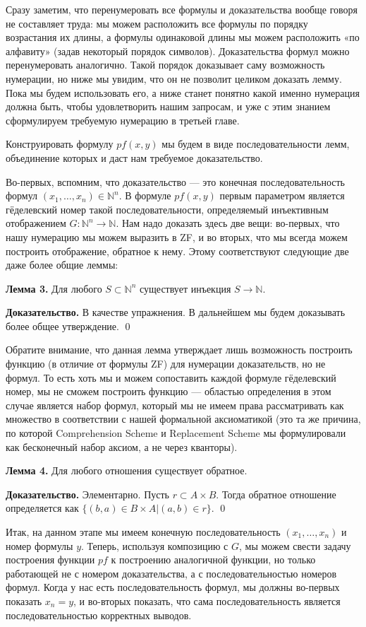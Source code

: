 Сразу заметим, что перенумеровать все формулы и доказательства вообще говоря не составляет труда: мы можем расположить все формулы по порядку возрастания их длины, а формулы одинаковой длины мы можем расположить «по алфавиту» (задав некоторый порядок символов). Доказательства формул можно перенумеровать аналогично. Такой порядок доказывает саму возможность нумерации, но ниже мы увидим, что он не позволит целиком доказать лемму. Пока мы будем использовать его, а ниже станет понятно какой именно нумерация должна быть, чтобы удовлетворить нашим запросам, и уже с этим знанием сформулируем требуемую нумерацию в третьей главе.

Конструировать формулу $pf(x, y)$ мы будем в виде последовательности лемм, объединение которых и даст нам требуемое доказательство.

Во-первых, вспомним, что доказательство — это конечная последовательность формул $(x_1, \ldots, x_n) \in \mathbb{N}^n$. В формуле $pf(x, y)$ первым параметром является гёделевский номер такой последовательности, определяемый инъективным отображением $G: \mathbb{N}^n \to \mathbb{N}$. Нам надо доказать здесь две вещи: во-первых, что нашу нумерацию мы можем выразить в ZF, и во вторых, что мы всегда можем построить отображение, обратное к нему. Этому соответствуют следующие две даже более общие леммы:

{\bfseries Лемма 3.} Для любого $S\subset \mathbb{N}^n$ существует инъекция $S \to \mathbb{N}$.

{\bfseries Доказательство.} В качестве упражнения. В дальнейшем мы будем доказывать более общее утверждение. \qed

Обратите внимание, что данная лемма утверждает лишь возможность построить функцию (в отличие от формулы ZF) для нумерации доказательств, но не формул. То есть хоть мы и можем сопоставить каждой формуле гёделевский номер, мы не сможем построить функцию — областью определения в этом случае является набор формул, который мы не имеем права рассматривать как множество в соответствии с нашей формальной аксиоматикой (это та же причина, по которой Comprehension Scheme и Replacement Scheme мы формулировали как бесконечный набор аксиом, а не через кванторы).

{\bfseries Лемма 4.} Для любого отношения существует обратное.

{\bfseries Доказательство.} Элементарно. Пусть $r\subset A\times B$. Тогда обратное отношение определяется как $\{(b, a)\in B\times A|(a, b)\in r\}$. \qed

Итак, на данном этапе мы имеем конечную последовательность $(x_1, \ldots, x_n)$ и номер формулы $y$. Теперь, используя композицию с $G$, мы можем свести задачу построения функции $pf$ к построению аналогичной функции, но только работающей не с номером доказательства, а с последовательностью номеров формул. Когда у нас есть последовательность формул, мы должны во-первых показать $x_n = y$, и во-вторых показать, что сама последовательность является последовательностью корректных выводов.

